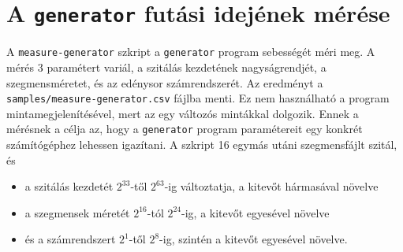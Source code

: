 \section{A \texttt{generator} futási idejének mérése}

A \texttt{measure-generator} szkript a \texttt{generator} program sebességét méri meg.
A mérés 3 paramétert variál, a szitálás kezdetének nagyságrendjét, a szegmensméretet, és az edénysor számrendszerét.
Az eredményt a \texttt{samples/measure-generator.csv} fájlba menti.
Ez nem használható a program mintamegjelenítésével, mert az egy változós mintákkal dolgozik.
Ennek a mérésnek a célja az, hogy a \texttt{generator} program paramétereit egy konkrét számítógéphez lehessen igazítani.
A szkript 16 egymás utáni szegmensfájlt szitál, és
\begin{itemize}
\item a szitálás kezdetét $2^{33}$-től $2^{63}$-ig változtatja, a kitevőt hármasával növelve
\item a szegmensek méretét $2^{16}$-tól $2^{24}$-ig, a kitevőt egyesével növelve
\item és a számrendszert $2^1$-től $2^8$-ig, szintén a kitevőt egyesével növelve.
\end{itemize}

